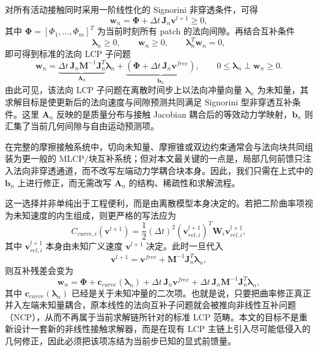 对所有活动接触同时采用一阶线性化的 Signorini 非穿透条件，可得
\begin{equation}
    \mathbf{w}_n = \boldsymbol{\Phi} + \Delta t\,\mathbf{J}_n \mathbf{v}^{l+1} \ge 0,
\end{equation}
其中 $\boldsymbol{\Phi}=[\Phi_1,\ldots,\Phi_m]^T$ 为当前时刻所有 patch 的法向间隙。再结合互补条件
\begin{equation}
    \boldsymbol{\lambda}_n \ge 0,\qquad
    \mathbf{w}_n \ge 0,\qquad
    \boldsymbol{\lambda}_n^T\mathbf{w}_n = 0,
\end{equation}
即可得到标准的法向 LCP 子问题
\begin{equation}
    \mathbf{w}_n
    =
    \underbrace{\Delta t\,\mathbf{J}_n\mathbf{M}^{-1}\mathbf{J}_n^T}_{\mathbf{A}_n}
    \boldsymbol{\lambda}_n
    +
    \underbrace{\left(\boldsymbol{\Phi} + \Delta t\,\mathbf{J}_n \mathbf{v}^{free}\right)}_{\mathbf{b}_n},
    \qquad
    0 \le \boldsymbol{\lambda}_n \perp \mathbf{w}_n \ge 0.
\end{equation}
由此可见，该法向 LCP 子问题在离散时间步上以法向冲量向量 $\boldsymbol{\lambda}_n$ 为未知量，其求解目标是使更新后的法向速度与间隙预测共同满足 Signorini 型非穿透互补条件。这里 $\mathbf{A}_n$ 反映的是质量分布与接触 Jacobian 耦合后的等效动力学映射，$\mathbf{b}_n$ 则汇集了当前几何间隙与自由运动预测项。

在完整的摩擦接触系统中，切向未知量、摩擦锥或双边约束通常会与法向块共同组装为更一般的 MLCP/块互补系统；但对本文最关键的一点是，局部几何前馈只注入法向非穿透通道，而不改写左端动力学耦合块本身。因此，我们只需在上式中的 $\mathbf{b}_n$ 上进行修正，而无需改写 $\mathbf{A}_n$ 的结构、稀疏性和求解流程。

这一选择并非单纯出于工程便利，而是由离散模型本身决定的。若把二阶曲率项视为未知速度的内生组成，则更严格的写法应为
\begin{equation}
    C_{curve,i}(\mathbf{v}^{l+1})
    =
    \frac{1}{2}(\Delta t)^2
    (\mathbf{v}_{rel,i}^{l+1})^T
    \mathbf{W}_i
    \mathbf{v}_{rel,i}^{l+1},
\end{equation}
其中 $\mathbf{v}_{rel,i}^{l+1}$ 本身由未知广义速度 $\mathbf{v}^{l+1}$ 决定。此时一旦代入
\begin{equation}
    \mathbf{v}^{l+1}
    =
    \mathbf{v}^{free}
    +
    \mathbf{M}^{-1}\mathbf{J}_n^T \boldsymbol{\lambda}_n,
\end{equation}
则互补残差会变为
\begin{equation}
    \mathbf{w}_n
    =
    \boldsymbol{\Phi}
    +
    \mathbf{c}_{curve}(\boldsymbol{\lambda}_n)
    +
    \Delta t\,\mathbf{J}_n\mathbf{v}^{free}
    +
    \Delta t\,\mathbf{J}_n\mathbf{M}^{-1}\mathbf{J}_n^T\boldsymbol{\lambda}_n,
\end{equation}
其中 $\mathbf{c}_{curve}(\boldsymbol{\lambda}_n)$ 已经是关于未知冲量的二次项。也就是说，只要把曲率修正真正并入左端未知量耦合，原本线性的法向互补子问题就会被推向非线性互补问题（NCP），从而不再属于当前求解链所针对的标准 LCP 范畴。本文的目标不是重新设计一套新的非线性接触求解器，而是在现有 LCP 主链上引入尽可能低侵入的几何修正，因此必须把该项冻结为当前步已知的显式前馈量。

